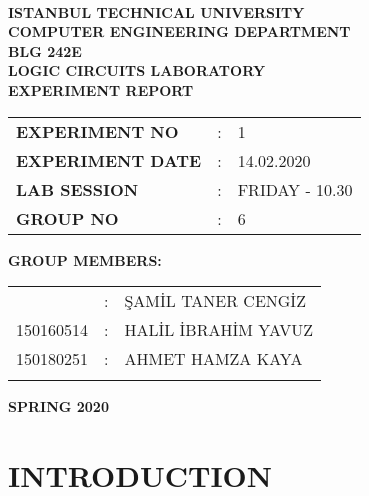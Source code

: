 \documentclass[pdftex,12pt,a4paper]{article}
\begin{document}
\begin{titlepage}
\begin{center}
\textbf{}\\
\textbf{\Large{ISTANBUL TECHNICAL UNIVERSITY}}\\
\vspace{0.5cm}
\textbf{\Large{COMPUTER ENGINEERING DEPARTMENT}}\\
\vspace{2cm}
\textbf{\Large{BLG 242E\\ LOGIC CIRCUITS LABORATORY\\ EXPERIMENT REPORT}}\\
\vspace{2.8cm}
\begin{table}[ht]
\centering
\Large{
\begin{tabular}{lcl}
\textbf{EXPERIMENT NO}  & : & 1 \\
\textbf{EXPERIMENT DATE}  & : & 14.02.2020 \\
\textbf{LAB SESSION}  & : & FRIDAY - 10.30 \\
\textbf{GROUP NO}  & : & 6 \\
\end{tabular}}
\end{table}
\vspace{1cm}
\textbf{\Large{GROUP MEMBERS:}}\\
\begin{table}[ht]
\centering
\Large{
\begin{tabular}{rcl}
{
150170706  & : & \c{S}AM\.{I}L TANER CENG\.{I}Z \\
150160514  & : & HAL\.{I}L \.{I}BRAH\.{I}M YAVUZ \\
150180251  & : & AHMET HAMZA KAYA \\
}
\end{tabular}}
\end{table}
\vspace{2.8cm}
\textbf{\Large{SPRING 2020}}

\end{center}

\end{titlepage}

\newpage

\thispagestyle{empty}
\setcounter{tocdepth}{4}
\tableofcontents
\clearpage

\setcounter{page}{1}
\section{INTRODUCTION }
\end{document}
